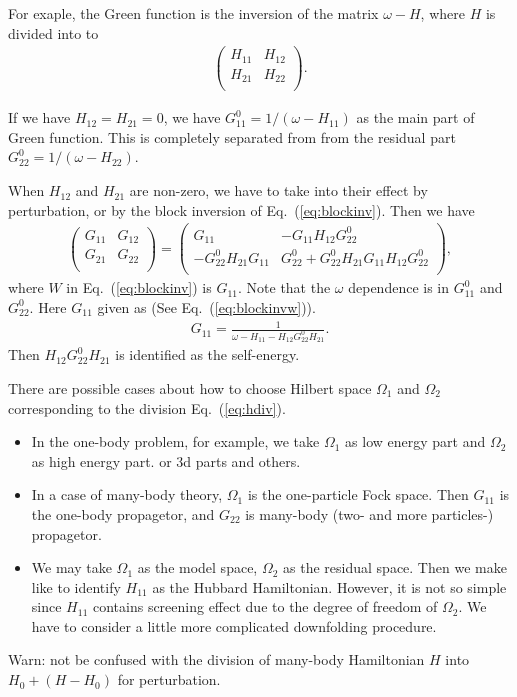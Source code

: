 \documentclass[a4paper,10pt,fleqn]{article}
\newcommand{\req}[1]{\mbox{Eq.~(\ref{#1})}}
\begin{document}
For exaple, the Green function is the inversion of the matrix $\omega-H$,
where $H$ is divided into to
\begin{eqnarray}
\left(\begin{array}{cc} H_{11} & H_{12} \\ H_{21}& H_{22} \\ \end{array} \right).
\label{eq:hdiv}
\end{eqnarray}

If we have $H_{12}=H_{21}=0$, we have $G^0_{11}=1/(\omega -H_{11})$ 
as the main part of Green function. This is completely separated from
from the residual part $G_{22}^0=1/(\omega -H_{22})$.

When $H_{12}$ and $H_{21}$ are non-zero,
we have to take into their effect by perturbation, or by the block inversion
of \req{eq:blockinv}. Then we have
\begin{eqnarray}
\left(\begin{array}{cc} G_{11} & G_{12} \\ G_{21} & G_{22} \\ \end{array} \right)
=
\left(\begin{array}{cc} G_{11} & -G_{11}H_{12}G^0_{22} 
                    \\ -G^0_{22}H_{21}G_{11} & G^0_{22}+G^0_{22}H_{21}G_{11}H_{12}G^0_{22} \\ \end{array} \right),
\end{eqnarray}
where $W$ in \req{eq:blockinv} is $G_{11}$. Note that the $\omega$ dependence is
in $G^0_{11}$ and $G^0_{22}$. Here $G_{11}$ given as (See \req{eq:blockinvw}).
\begin{eqnarray}
G_{11}=\frac{1}{\omega - H_{11} - H_{12}G^0_{22}H_{21}}.
\label{eq:g11}
\end{eqnarray}
Then $ H_{12}G^0_{22}H_{21}$ is identified as the self-energy.

There are possible cases about how to choose Hilbert space $\Omega_1$ and
$\Omega_2$ corresponding to the division \req{eq:hdiv}. 
\begin{itemize}
\item
In the one-body problem, for example, we take $\Omega_1$ as low energy part
and $\Omega_2$ as high energy part. or 3d parts and others. 
\item
In a case of many-body theory, 
$\Omega_1$ is the one-particle Fock space. 
Then $G_{11}$ is the one-body propagetor, and $G_{22}$ is many-body (two-
and more particles-) propagetor.
\item
We may take $\Omega_1$ as the model space, $\Omega_2$ as the residual space.
Then we make like to identify $H_{11}$ as the Hubbard Hamiltonian.
However, it is not so simple since $H_{11}$ contains screening effect
due to the degree of freedom of $\Omega_2$. We have to consider a little more
complicated downfolding procedure.
\end{itemize}
Warn: not be confused with the division of many-body Hamiltonian $H$ into
$H_0 + (H-H_0)$ for perturbation.
\end{document}
